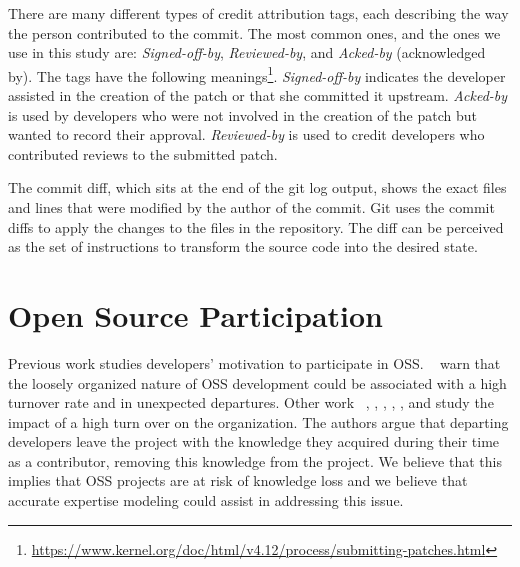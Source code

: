 There are many different types of credit attribution tags, each describing the way the person contributed to the commit. The most common ones, and the ones we use in this study are: \textit{Signed-off-by}, \textit{Reviewed-by}, and \textit{Acked-by} (acknowledged by). The tags have the following meanings\footnote{\url{https://www.kernel.org/doc/html/v4.12/process/submitting-patches.html}}. \textit{Signed-off-by} indicates the developer assisted in the creation of the patch or that she committed it upstream. \textit{Acked-by} is used by developers who were not involved in the creation of the patch but wanted to record their approval. \textit{Reviewed-by} is used to credit developers who contributed reviews to the submitted patch. 

The commit diff, which sits at the end of the git log output, shows the exact files and lines that were modified by the author of the commit. Git uses the commit diffs to apply the changes to the files in the repository. The diff can be perceived as the set of instructions to transform the source code into the desired state.



\section{Open Source Participation}

Previous work studies developers' motivation to participate in \ac{OSS}. ~\citep{Wu-oss} warn that the loosely organized nature of OSS development could be associated with a high turnover rate and in unexpected departures. Other work ~\citep{Rigby}, \citep{Foucault}, \citep{Izquierdo-Cortazar}, \citep{Mockus:2010}, \citep{Torchiano:2011:MPT:1985374.1985379}, and \citep{Ricca:2011:DCT:2022348.2022383} study the impact of a high turn over on the organization. The authors argue that departing developers leave the project with the knowledge they acquired during their time as a contributor, removing this knowledge from the project. We believe that this implies that OSS projects are at risk of knowledge loss and we believe that accurate expertise modeling could assist in addressing this issue.





